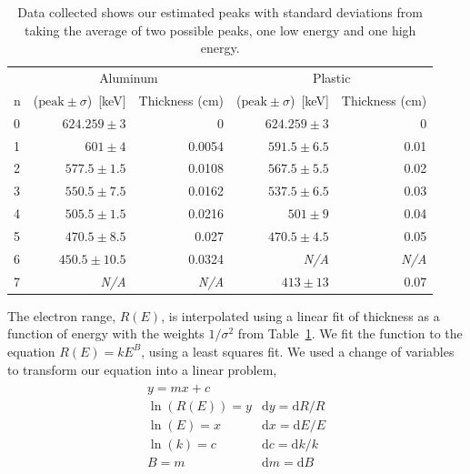 \begin{table}
	[tbp] 
	\begin{center}
		\begin{tabular}{lrrrr}
\toprule
 	 &  		\multicolumn{2}{c}{Aluminum} 			 & 			\multicolumn{2}{c}{Plastic} 				\\
\cmidrule(r){2-3}
\cmidrule(r){4-5}
n    & ($\text{peak}\pm\sigma$)~[keV] 	& Thickness (cm) & ($\text{peak}\pm\sigma$)~[keV] 	& Thickness (cm) 	\\
\midrule
0    & $624.259\pm3$					&	0	         &	$624.259\pm3$					&	0   			\\
1    & $601\pm4$						&	0.0054		 &	$591.5\pm6.5$					&	0.01			\\
2    & $577.5\pm1.5$					&	0.0108		 &	$567.5\pm5.5$					&	0.02			\\
3    & $550.5\pm7.5$					&	0.0162		 &	$537.5\pm6.5$					&	0.03			\\
4    & $505.5\pm1.5$					&	0.0216		 &	$501\pm9$						&	0.04			\\
5    & $470.5\pm8.5$					&	0.027	     &	$470.5\pm4.5$					&	0.05			\\
6    & $450.5\pm10.5$					&	0.0324		 &	\textit{N/A}					&	\textit{N/A}	\\
7    & 	\textit{N/A}	    			&	\textit{N/A} &	$413\pm13$						&	0.07  			\\
\bottomrule
		\end{tabular}
	\end{center}
	\caption{Data collected shows our estimated peaks with standard deviations from taking the average of two possible peaks, one low energy and one high energy.} \label{tab:dataCollected}
\end{table}%
The electron range, $R(E)$, is interpolated using a linear fit of thickness as a function of energy with the weights $1/\sigma^2$ from Table~\ref{tab:dataCollected}. We fit the function to the equation $R(E)=kE^B$, using a least squares fit.  We used a change of variables to transform our equation into a linear problem,
\begin{align*}
	\begin{matrix}
		y = m x + c 	 						\\
		\ln(R(E)) = y 	& 	\mathrm{d}y = \mathrm{d}R/R				\\
		\ln(E) = x 		& 	\mathrm{d}x = \mathrm{d}E/E				\\
		\ln(k) = c 		& 	\mathrm{d}c = \mathrm{d}k/k				\\
		B = m 			& 	\mathrm{d}m = \mathrm{d}B				\\
	\end{matrix}
\end{align*}


